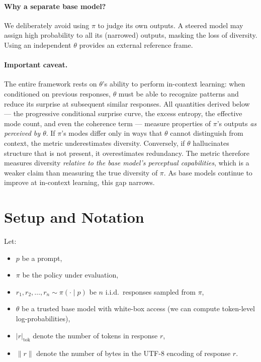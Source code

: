 \documentclass[11pt]{article}
\begin{document}
\paragraph{Why a separate base model?} We deliberately avoid using $\pi$ to judge its own outputs. A steered model may assign high probability to all its (narrowed) outputs, masking the loss of diversity. Using an independent $\theta$ provides an external reference frame.

\paragraph{Important caveat.} The entire framework rests on $\theta$'s ability to perform in-context learning: when conditioned on previous responses, $\theta$ must be able to recognize patterns and reduce its surprise at subsequent similar responses. All quantities derived below --- the progressive conditional surprise curve, the excess entropy, the effective mode count, and even the coherence term --- measure properties of $\pi$'s outputs \emph{as perceived by $\theta$}. If $\pi$'s modes differ only in ways that $\theta$ cannot distinguish from context, the metric underestimates diversity. Conversely, if $\theta$ hallucinates structure that is not present, it overestimates redundancy. The metric therefore measures diversity \emph{relative to the base model's perceptual capabilities}, which is a weaker claim than measuring the true diversity of $\pi$. As base models continue to improve at in-context learning, this gap narrows.

\section{Setup and Notation}

Let:
\begin{itemize}[nosep]
    \item $p$ be a prompt,
    \item $\pi$ be the policy under evaluation,
    \item $r_1, r_2, \ldots, r_n \sim \pi(\cdot \mid p)$ be $n$ i.i.d.\ responses sampled from $\pi$,
    \item $\theta$ be a trusted base model with white-box access (we can compute token-level log-probabilities),
    \item $|r|_{\mathrm{tok}}$ denote the number of tokens in response $r$,
    \item $\|r\|$ denote the number of bytes in the UTF-8 encoding of response $r$.
\end{itemize}
\end{document}
